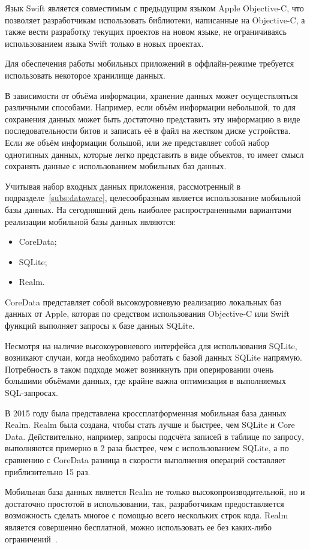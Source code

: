 Язык Swift является совместимым с предыдущим языком Apple Objective-C,
что позволяет разработчикам использовать библиотеки, написанные на Objective-C,
а также вести разработку текущих проектов на новом языке, не ограничиваясь
использованием языка Swift только в новых проектах.

Для обеспечения работы мобильных приложений в оффлайн-режиме требуется
использовать некоторое хранилище данных.

В зависимости от объёма информации, хранение данных может осуществляться
различными способами. Например, если объём информации небольшой, то для
сохранения данных может быть достаточно представить эту информацию
в виде последовательности битов и записать её в файл на жестком диске устройства.
Если же объём информации большой, или же представляет собой набор однотипных данных,
которые легко представить в виде объектов, то имеет смысл сохранять данные
с использованием мобильных баз данных.

Учитывая набор входных данных приложения, рассмотренный в подразделе~\ref{subs:dataware},
целесообразным является использование мобильной базы данных. На сегодняшний день
наиболее распространенными вариантами реализации мобильной базы данных являются:
\begin{itemize}
  \item CoreData;
  \item SQLite;
  \item Realm.
\end{itemize}

CoreData представляет собой высокоуровневую реализацию локальных баз данных от Apple,
которая по средством использования Objective-C или Swift функций
выполняет запросы к базе данных SQLite.

Несмотря на наличие высокоуровневого интерфейса для использования SQLite,
возникают случаи, когда необходимо работать с базой данных SQLite напрямую.
Потребность в таком подходе может возникнуть при оперировании очень большими
объёмами данных, где крайне важна оптимизация в выполняемых SQL-запросах.

В 2015 году была представлена кроссплатформенная мобильная база данных Realm.
Realm была создана, чтобы стать лучше и быстрее, чем SQLite и Core Data.
Действительно, например, запросы подсчёта записей в таблице по запросу,
выполняются примерно в 2 раза быстрее, чем с использованием SQLite,
а по сравнению с CoreData разница в скорости выполнения операций составляет
приблизительно 15 раз.

Мобильная база данных является Realm не только высокопроизводительной,
но и достаточно простотой в использовании, так, разработчикам предоставляется возможность
сделать многое с помощью всего нескольких строк кода. Realm является
совершенно бесплатной, можно использовать ее без каких-либо ограничений~\cite{todo_swift_realm}.


